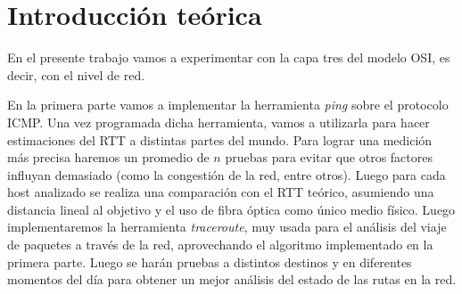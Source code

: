 \section{Introducción teórica}

En el presente trabajo vamos a experimentar con la capa tres del modelo OSI,
es decir, con el nivel de red.

En la primera parte vamos a implementar la herramienta \textit{ping} sobre el protocolo
ICMP. Una vez programada dicha herramienta, vamos a utilizarla para hacer
estimaciones del RTT a distintas partes del mundo. Para lograr una medición
más precisa haremos un promedio de $n$ pruebas para evitar que otros factores
influyan demasiado (como la congestión de la red, entre otros). Luego para
cada host analizado se realiza una comparación con el RTT teórico, asumiendo
una distancia lineal al objetivo y el uso de fibra óptica como único medio
físico.
Luego implementaremos la herramienta \textit{traceroute}, muy usada
para el análisis del viaje de paquetes a través de la red, aprovechando el
algoritmo implementado en la primera parte. Luego se harán pruebas a distintos
destinos y en diferentes momentos del día para obtener un mejor análisis del
estado de las rutas en la red.
